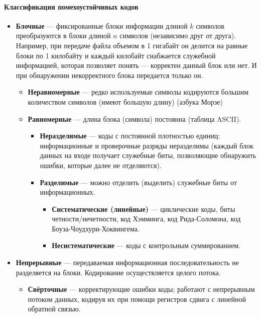 \paragraph{Классификация помехоустойчивых кодов}\label{par:error-correcting-code-classification}

\begin{itemize}
    \item \textbf{Блочные} --- фиксированные блоки информации длиной $k$ символов преобразуются в блоки длиной $n$ символов (независимо друг от друга). Например, при передаче файла объемом в 1 гигабайт он делится на равные блоки по 1 килобайту и каждый килобайт снабжается служебной информацией, которая позволяет понять --- корректен данный блок или нет. И при обнаружении некорректного блока передается только он.
          \begin{itemize}
              \item \textbf{Неравномерные} --- редко используемые символы кодируются большим количеством символов (имеют большую длину) (азбука Морзе)
              \item \textbf{Равномерные} --- длина блока (символа) постоянна (таблица ASCII).
                    \begin{itemize}
              \item \textbf{Неразделимые} --- коды с постоянной плотностью единиц: информационные и проверочные разряды неразделимы (каждый блок данных на входе получает служебные биты, позволяющие обнаружить ошибки, которые далее не отделяются).
              \item \textbf{Разделимые} --- можно отделить (выделить) служебные биты от информационных.
                              \begin{itemize}
              \item \textbf{Систематические (линейные)} --- циклические коды, биты четности/нечетности, код Хэмминга, код Рида-Соломона, код Боуза-Чоудхури-Хоквингема.
              \item \textbf{Несистематические} --- коды с контрольным суммированием.
          \end{itemize}
                    \end{itemize}
          \end{itemize}
    \item \textbf{Непрерывные} --- передаваемая информационная последовательность не разделяется на блоки. Кодирование осуществляется целого потока.
          \begin{itemize}
              \item \textbf{Свёрточные} --- корректирующие ошибки коды; работают с непрерывным потоком данных, кодируя их при помощи регистров сдвига с линейной обратной связью.
          \end{itemize}
\end{itemize}


